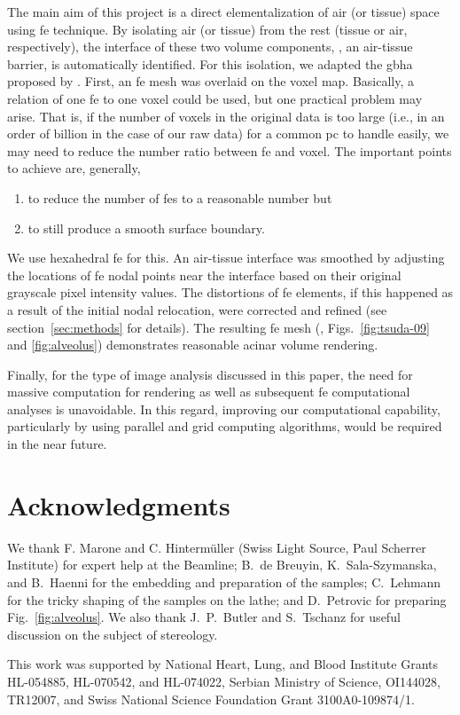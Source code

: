 The main aim of this project is a direct elementalization of air (or tissue) space using \ac{fe} technique. By isolating air (or tissue) from the rest (tissue or air, respectively), the interface of these two volume components, \ie, an air-tissue barrier, is automatically identified. For this isolation, we adapted the \ac{gbha} proposed by \citet{Schneiders1996}. First, an \ac{fe} mesh was overlaid on the voxel map. Basically, a relation of one \ac{fe} to one voxel could be used, but one practical problem may arise. That is, if the number of voxels in the original data is too large (i.e., in an order of billion in the case of our raw data) for a common \acs{pc} to handle easily, we may need to reduce the number ratio between \ac{fe} and voxel. The important points to achieve are, generally, 
\begin{enumerate}
	\item to reduce the number of \acp{fe} to a reasonable number but
	\item to still produce a smooth surface boundary.
\end{enumerate}
We use hexahedral \ac{fe} for this. An air-tissue interface was smoothed by adjusting the locations of \ac{fe} nodal points near the interface based on their original grayscale pixel intensity values. The distortions of \ac{fe} elements, if this happened as a result of the initial nodal relocation, were corrected and refined (see section~\ref{sec:methods} for details). The resulting \threed \ac{fe} mesh (\eg, Figs.~\ref{fig:tsuda-09} and \ref{fig:alveolus}) demonstrates reasonable acinar volume rendering.

Finally, for the type of image analysis discussed in this paper, the need for massive computation for \threed rendering as well as subsequent \ac{fe} computational analyses is unavoidable. In this regard, improving our computational capability, particularly by using parallel and grid computing algorithms, would be required in the near future.

\section{Acknowledgments}
We thank F. Marone and C. Hintermüller (Swiss Light Source, Paul Scherrer Institute) for expert help at the Beamline; B.\ de Breuyin, K.\ Sala-Szymanska, and B.\ Haenni for the embedding and preparation of the samples; C.\ Lehmann for the tricky shaping of the samples on the lathe; and D.\ Petrovic for preparing Fig.~\ref{fig:alveolus}. We also thank J.\ P.\ Butler and S.\ Tschanz for useful discussion on the subject of stereology.

This work was supported by National Heart, Lung, and Blood Institute Grants HL-054885, HL-070542, and HL-074022, Serbian Ministry of Science, OI144028, TR12007, and Swiss National Science Foundation Grant 3100A0-109874/1.
%
%
